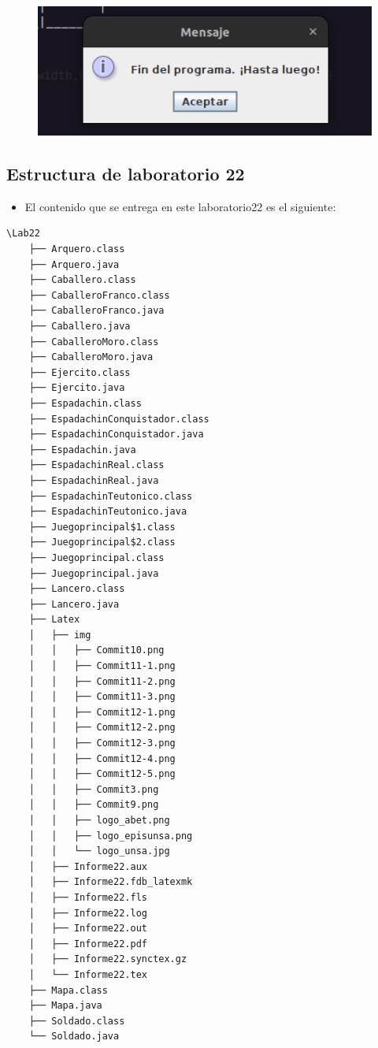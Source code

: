 \documentclass{article}
\begin{document}
	\begin{figure}[H]
		\centering
		\includegraphics[width=1.0\textwidth,keepaspectratio]{img/Commit12-4.png}
	\end{figure}
	\subsection{Estructura de laboratorio 22}
	\begin{itemize}	
		\item El contenido que se entrega en este laboratorio22 es el siguiente:
	\end{itemize}
	\begin{lstlisting}[style=ascii-tree]
	\Lab22
	├── Arquero.class
	├── Arquero.java
	├── Caballero.class
	├── CaballeroFranco.class
	├── CaballeroFranco.java
	├── Caballero.java
	├── CaballeroMoro.class
	├── CaballeroMoro.java
	├── Ejercito.class
	├── Ejercito.java
	├── Espadachin.class
	├── EspadachinConquistador.class
	├── EspadachinConquistador.java
	├── Espadachin.java
	├── EspadachinReal.class
	├── EspadachinReal.java
	├── EspadachinTeutonico.class
	├── EspadachinTeutonico.java
	├── Juegoprincipal$1.class
	├── Juegoprincipal$2.class
	├── Juegoprincipal.class
	├── Juegoprincipal.java
	├── Lancero.class
	├── Lancero.java
	├── Latex
	│   ├── img
	│   │   ├── Commit10.png
	│   │   ├── Commit11-1.png
	│   │   ├── Commit11-2.png
	│   │   ├── Commit11-3.png
	│   │   ├── Commit12-1.png
	│   │   ├── Commit12-2.png
	│   │   ├── Commit12-3.png
	│   │   ├── Commit12-4.png
	│   │   ├── Commit12-5.png
	│   │   ├── Commit3.png
	│   │   ├── Commit9.png
	│   │   ├── logo_abet.png
	│   │   ├── logo_episunsa.png
	│   │   └── logo_unsa.jpg
	│   ├── Informe22.aux
	│   ├── Informe22.fdb_latexmk
	│   ├── Informe22.fls
	│   ├── Informe22.log
	│   ├── Informe22.out
	│   ├── Informe22.pdf
	│   ├── Informe22.synctex.gz
	│   └── Informe22.tex
	├── Mapa.class
	├── Mapa.java
	├── Soldado.class
	└── Soldado.java
	
	\end{lstlisting}    
\end{document}
